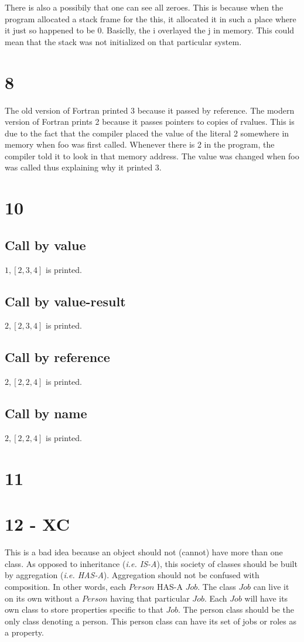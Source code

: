 \documentclass[11pt, oneside]{article}
\begin{document}
There is also a possibily that one can see all zeroes. This is because when the program allocated a stack frame for the  this, it allocated it in such a place where it just so happened to be 0. Basiclly, the i overlayed the j in memory. This could mean that the stack was not initialized on that particular system.

\section*{8}
The old version of Fortran printed 3 because it passed by reference. The modern version of Fortran prints 2 because it passes pointers to copies of rvalues. This is due to the fact that the compiler placed the value of the literal 2 somewhere in memory when foo was first called. Whenever there is 2 in the program, the compiler told it to look in that memory address. The value was changed when foo was called thus explaining why it printed 3.

\section*{10}
\subsection*{Call by value}
$1, [2, 3, 4]$ is printed.

\subsection*{Call by value-result}
$2, [2, 3, 4]$ is printed.

\subsection*{Call by reference}
$2, [2, 2, 4]$ is printed.

\subsection*{Call by name}
$2, [2, 2, 4]$ is printed.

\section*{11}

\section*{12 - XC}
This is a bad idea because an object should not (cannot) have more than one class. As opposed to inheritance (\textit{i.e. IS-A}), this society of classes should be built by aggregation (\textit{i.e. HAS-A}). Aggregation should not be confused with composition. In other words, each $Person$ HAS-A $Job$. The class $Job$ can live it on its own without a $Person$ having that particular $Job$. Each $Job$ will have its own class to store properties specific to that $Job$. The person class should be the only class denoting a person. This person class can have its set of jobs or roles as a property.
\end{document}
